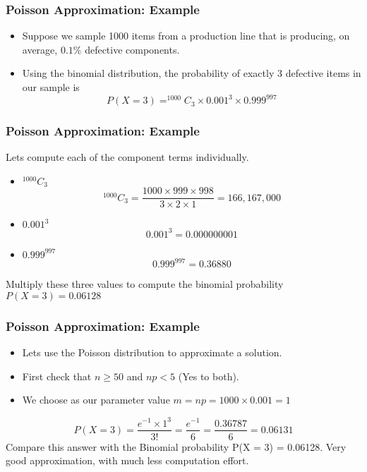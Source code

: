 \documentclass[a4]{beamer}
\begin{document}
\begin{frame}
\frametitle{Poisson Approximation: Example}

\begin{itemize}
\item Suppose we sample 1000 items from a production line that is producing, on
average, $0.1\%$ defective components.
\item Using the binomial distribution, the probability of exactly 3 defective items in
our sample is
\[P(X = 3) = ^{1000}C_{3} \times 0.001^{3} \times 0.999^{997}\]
\end{itemize}
\end{frame}

\begin{frame}
\frametitle{Poisson Approximation: Example}
Lets compute each of the component terms individually.

\begin{itemize}
\item $^{1000}C_{3}$
\[^{1000}C_{3} = \frac{1000 \times 999 \times 998}{3 \times 2 \times 1} = 166,167,000\]
\item $0.001^3$
\[0.001^3 = 0.000000001\]
\item $0.999^{997}$
\[0.999^{997} = 0.36880\]
\end{itemize}


Multiply these three values to compute the binomial probability
$P(X = 3) = 0.06128$
\end{frame}

\begin{frame}
\frametitle{Poisson Approximation: Example}
\begin{itemize}
\item Lets use the Poisson distribution to approximate a solution.
\item First check that $n \geq 50$ and $np < 5$ (Yes to both).
\item We choose as our parameter value $m = np = 1000 \times 0.001 = 1$
\end{itemize}
\[P(X = 3) = \frac{e^{-1} \times 1^3}{3!} = \frac{e^{-1}}{6} = \frac{0.36787}{6} = 0.06131 \]
Compare this answer with the Binomial probability
P(X = 3) = 0.06128.
Very good approximation, with much less computation effort.
\end{frame}
\end{document}
